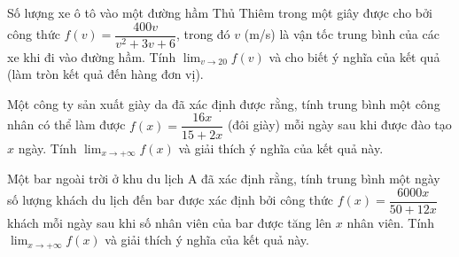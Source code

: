 \begin{ex}%

	Số lượng xe ô tô  vào một đường hầm Thủ Thiêm trong một giây được cho bởi công thức $f\left(v\right) = \dfrac{400v}{v^2+3v+6}$, trong đó $v$ (m/s) là vận tốc trung bình của các xe khi đi vào đường hầm. Tính $\displaystyle\lim_{v \to 20} f\left(v\right)$ và cho biết ý nghĩa của kết quả (làm tròn kết quả đến hàng đơn vị).
\end{ex}

\begin{ex}%

	Một công ty sản  xuất giày da đã xác định được rằng, tính trung bình một công nhân có thể làm được $f(x) = \dfrac{16x}{15 + 2x}$ (đôi giày) mỗi ngày sau khi được đào tạo $x$ ngày. Tính $\displaystyle\lim_{x \to +\infty} f(x)$ và giải thích ý nghĩa của kết quả này.
\end{ex}

\begin{ex}%

	Một  bar ngoài trời ở khu du lịch A đã xác định rằng, tính trung bình một ngày số lượng khách du lịch đến bar được xác định bởi công thức $f\left(x\right) = \dfrac{6000x}{50 + 12x}$ khách mỗi ngày sau khi số nhân viên của bar được tăng lên $x$ nhân viên. Tính $\displaystyle\lim_{x \to +\infty} f\left(x\right)$ và giải thích ý nghĩa của kết quả này.
\end{ex}

